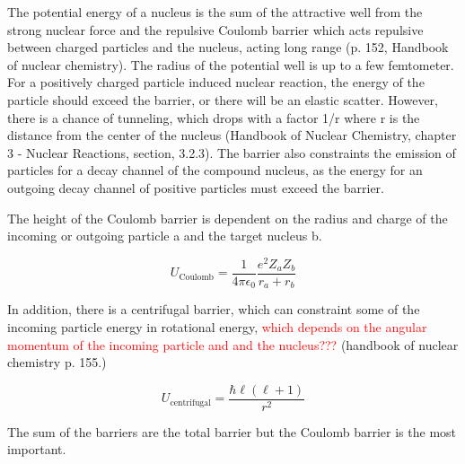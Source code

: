 \documentclass[a4paper,11pt,twoside]{book}
\begin{document}
The potential energy of a nucleus is the sum of the attractive well from the strong nuclear force and the repulsive Coulomb barrier which acts repulsive between charged particles and the nucleus, acting long range (p. 152, Handbook of nuclear chemistry). The radius of the potential well is up to a few femtometer. For a positively charged particle induced nuclear reaction, the energy of the particle should exceed the barrier, or there will be an elastic scatter. However, there is a chance of tunneling, which drops with a factor 1/r where r is the distance from the center of the nucleus (Handbook of Nuclear Chemistry, chapter 3 - Nuclear Reactions, section, 3.2.3). The barrier also constraints the emission of particles for a decay channel of the compound nucleus, as the energy for an outgoing decay channel of positive particles must exceed the barrier. %

The height of the Coulomb barrier is dependent on the radius and charge of the incoming or outgoing particle a and the target nucleus b.

\begin{equation}
    U_\text{Coulomb} = \frac{1}{4\pi \epsilon_0} \frac{e^2Z_a Z_b}{r_a + r_b}
\end{equation}

In addition, there is a centrifugal barrier, which can constraint some of the incoming particle energy in rotational energy, \textcolor{red}{which depends on the angular momentum of the incoming particle and and the nucleus???} (handbook of nuclear chemistry p. 155.)

\begin{equation}
    U_\text{centrifugal} = \frac{\hbar \ell (\ell+1)}{r^2}
\end{equation}

The sum of the barriers are the total barrier but the Coulomb barrier is the most important. 

\end{document}
